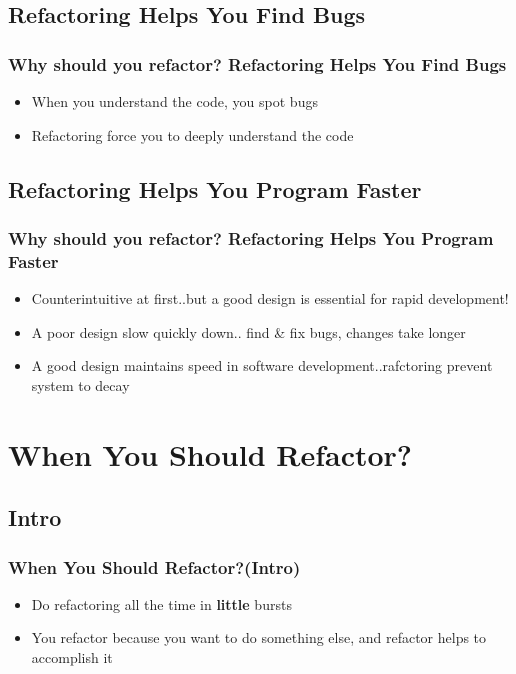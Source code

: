 \documentclass{beamer}
\begin{document}
\subsection{Refactoring Helps You Find Bugs}
\begin{frame}
  \frametitle{Why should you refactor? \textbf{Refactoring Helps You Find Bugs}} 
  \begin{itemize}
  		\item<+-> When you understand the code, you spot bugs
  		\item<+-> Refactoring force you to deeply understand the code
  \end{itemize}
\end{frame}

\subsection{Refactoring Helps You Program Faster}
\begin{frame}
  \frametitle{Why should you refactor? \textbf{Refactoring Helps You Program Faster}} 
  \begin{itemize}
  		\item<+-> Counterintuitive at first..but a good design is essential for rapid development!
  		\item<+-> A poor design slow quickly down.. find \& fix bugs, changes take longer
  		\item<+-> A good design maintains speed in software development..rafctoring prevent system to decay
  \end{itemize}
\end{frame}

\section{When You Should Refactor?}
\subsection{Intro}
\begin{frame}
  \frametitle{When You Should Refactor?(Intro)} 
  \begin{itemize}
  		\item<+-> Do refactoring all the time in \textbf{little} bursts
  		\item<+-> You refactor because you want to do something else, and refactor helps to accomplish it
  \end{itemize}
\end{frame}
\end{document}
